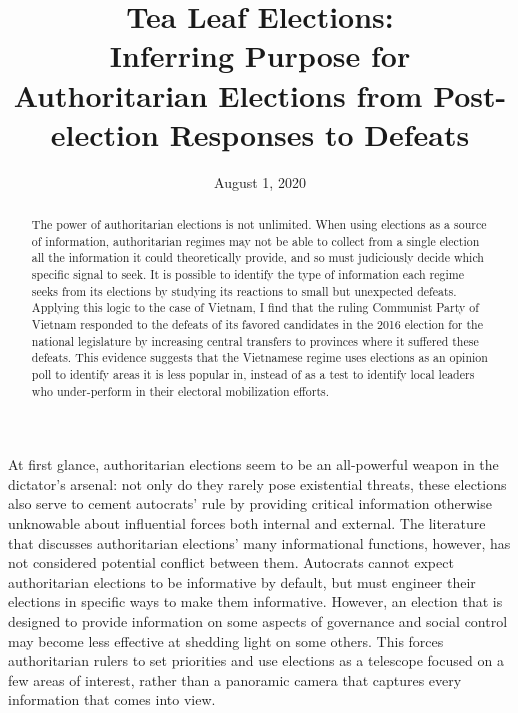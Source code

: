 \documentclass[12pt]{article}
\title{Tea Leaf Elections: \\
	Inferring Purpose for Authoritarian Elections from Post-election Responses to Defeats%
	\\
	\vspace{2ex}
	\vphantom{Online Appendix}}
\date{August 1, 2020}
\newcommand{\1}{\mathbbm{1}}
\begin{document}
	

\maketitle
\thispagestyle{empty}
\doublespacing


\begin{abstract}
The power of authoritarian elections is not unlimited. When using elections as a source of information, authoritarian regimes may not be able to collect from a single election all the information it could theoretically provide, and so must judiciously decide which specific signal to seek. It is possible to identify the type of information each regime seeks from its elections by studying its reactions to small but unexpected defeats. Applying this logic to the case of Vietnam, I find that the ruling Communist Party of Vietnam responded to the defeats of its favored candidates in the 2016 election for the national legislature by increasing central transfers to provinces where it suffered these defeats. This evidence suggests that the Vietnamese regime uses elections as an opinion poll to identify areas it is less popular in, instead of as a test to identify local leaders who under-perform in their electoral mobilization efforts.
\end{abstract}



\newpage



At first glance, authoritarian elections seem to be an all-powerful weapon in the dictator's arsenal: not only do they rarely pose existential threats, these elections also serve to cement autocrats' rule by providing critical information otherwise unknowable about influential forces both internal and external. The literature that discusses authoritarian elections' many informational functions, however, has not considered potential conflict between them. Autocrats cannot expect authoritarian elections to be informative by default, but must engineer their elections in specific ways to make them informative. However, an election that is designed to provide information on some aspects of governance and social control may become less effective at shedding light on some others. This forces authoritarian rulers to set priorities and use elections as a telescope focused on a few areas of interest, rather than a panoramic camera that captures every information that comes into view.
\end{document}
